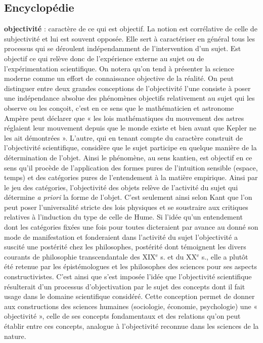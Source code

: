 \subsection{Encyclopédie}

{\bf objectivité} : caractère de ce qui est objectif.
La notion est corrélative de celle de
subjectivité et lui est souvent opposée.
Elle sert à caractériser en général tous les
processus qui se déroulent indépendamment
de l'intervention d’un sujet. Est
objectif ce qui relève donc de l’expérience
externe au sujet ou de l’expérimentation
scientifique. On notera qu’on tend à présenter
la science moderne comme un
effort de connaissance objective de la réalité.
On peut distinguer entre deux
grandes conceptions de l'objectivité
l'une consiste à poser une indépendance
absolue des phénomènes objectifs relativement
au sujet qui les observe ou les
conçoit, c’est en ce sens que le mathématicien
et astronome Ampère peut déclarer
que « les lois mathématiques du mouvement
des astres réglaient leur mouvement
depuis que le monde existe et bien avant
que Kepler ne les ait démontrées ».
L'autre, qui en tenant compte du caractère
construit de l’objectivité scientifique,
considère que le sujet participe en
quelque manière de la détermination de
l’objet. Ainsi le phénomène, au sens kantien,
est objectif en ce sens qu’il procède
de l’application des formes pures de l’intuition
sensible (espace, temps) et des
catégories pures de l’entendement à la
matière empirique. Ainsi par le jeu des
catégories, l’objectivité des objets relève
de l’activité du sujet qui détermine {\it a
priori} la forme de l’objet. C’est seulement
ainsi selon Kant que l’on peut poser l’universalité
stricte des lois physiques et se
soustraire aux critiques relatives à l’induction
du type de celle de Hume. Si l’idée
qu’un entendement dont les catégories
fixées une fois pour toutes dicteraient par
avance au donné son mode de manifestation
et fonderaient dans l’activité du sujet
l’objectivité a suscité une postérité chez
les philosophes, postérité dont témoignent
les divers courants de philosophie
transcendantale des {\footnotesize XIX}$^\text{e}$ s. et du {\footnotesize XX}$^\text{e}$ s.,
elle a plutôt été retenue par les épistémologues
et les philosophes des sciences
pour ses aspects constructivistes. C’est
ainsi que s’est imposée l’idée que l’objectivité
scientifique résulterait d’un processus
d’objectivation par le sujet des concepts
dont il fait usage dans le domaine scientifique
considéré. Cette conception permet
de donner aux constructions des sciences
humaines (sociologie, économie, psychologie)
une « objectivité », celle de ses
concepts fondamentaux et des relations
qu'on peut établir entre ces concepts, analogue
à l’objectivité reconnue dans les
sciences de la nature.


